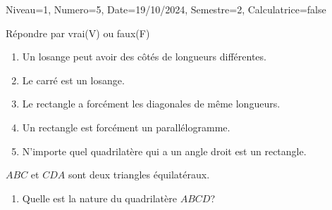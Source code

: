 \documentclass[a4paper,12pt]{article}
\begin{document}
\begin{Maquette}[DS]{Niveau=1, Numero=5, Date=19/10/2024, Semestre=2, Calculatrice=false}
\begin{exercice}
Répondre par vrai(V) ou faux(F)
\begin{enumerate}
\item{} Un losange peut avoir des côtés de longueurs différentes.
\item{} Le carré est un losange.
\item{} Le rectangle a forcément les diagonales de même longueurs.
\item{} Un rectangle est forcément un parallélogramme.
\item{} N'importe quel quadrilatère qui a un angle droit est un rectangle.
\end{enumerate}
\end{exercice}

\begin{exercice}
\begin{minipage}{.68\linewidth}
$ABC$ et $CDA$ sont deux triangles équilatéraux.
\begin{enumerate}
\item{} Quelle est la nature du quadrilatère $ABCD$?
\end{enumerate}
\anserline[5]
\end{minipage}
\begin{minipage}{.32\linewidth}
\end{minipage}

\end{exercice}


\end{Maquette}
\end{document}
